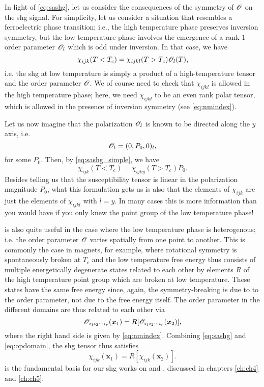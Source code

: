 In light of \cref{eq:sashg}, let us consider the consequences of the symmetry of $\mathscr{O}$ on the \gls{shg} signal.
For simplicity, let us consider a situation that resembles a ferroelectric phase transition; i.e., the high temperature phase preserves inversion symmetry, but the low temperature phase involves the emergence of a rank-$1$ order parameter $\mathscr{O}_l$ which is odd under inversion.
In that case, we have
\begin{equation}\label{eq:sashg_simple}
\chi_{ijk}(T<T_c) = \chi_{ijkl}(T>T_c)\mathscr{O}_{l}(T),
\end{equation}
i.e. the \gls{shg} at low temperature is simply a product of a high-temperature tensor and the order parameter $\mathscr{O}$.
We of course need to check that $\chi_{ijkl}$ is allowed in the high temperature phase; here, we need $\chi_{ijkl}$ to be an even rank polar tensor, which is allowed in the presence of inversion symmetry (see \cref{eq:nmindex}).

Let us now imagine that the polarization $\mathscr{O}_{l}$ is known to be directed along the $y$ axis, i.e.
\begin{equation}
\mathscr{O}_l = (0, P_0, 0)_l,
\end{equation}
for some $P_0$.
Then, by \cref{eq:sashg_simple}, we have
\begin{equation}
\chi_{ijk}(T<T_c) = \chi_{ijky}(T>T_c)P_0.
\end{equation}
Besides telling us that the susceptibility tensor is linear in the polarization magnitude $P_0$, what this formulation gets us is also that the elements of $\chi_{ijk}$ are just the elements of $\chi_{ijkl}$ with $l=y$.
In many cases this is more information than you would have if you only knew the point group of the low temperature phase!

 is also quite useful in the case where the low temperature phase is heterogenous; i.e. the order parameter $\mathscr{O}$ varies spatially from one point to another.
This is commonly the case in magnets, for example, where rotational symmetry is spontaneously broken at $T_c$ and the low temperature free energy thus consists of multiple energetically degenerate states related to each other by elements $R$ of the high temperature point group which are broken at low temperature.
These states have the same free energy since, again, the symmetry-breaking is due to to the order parameter, not due to the free energy itself.
The order parameter in the different domains are thus related to each other via
\begin{equation}\label{eq:opdomain}
\mathscr{O}_{i_1i_2\cdots i_r}(\bm{x}_1) = R[\mathscr{O}_{i_1i_2\cdots i_r}(\bm{x}_2)],
\end{equation}
where the right hand side is given by \cref{eq:nmindex}.
Combining \cref{eq:sashg} and \cref{eq:opdomain}, the \gls{shg} tensor thus satisfies
\begin{equation}\label{eq:shgdomain}
\chi_{ijk}(\bm{x}_1) = R[\chi_{ijk}(\bm{x}_2)].
\end{equation}
 is the fundamental basis for our \gls{shg} works on \tastwo and , discussed in chapters \cref{ch:ch4} and \cref{ch:ch5}.
